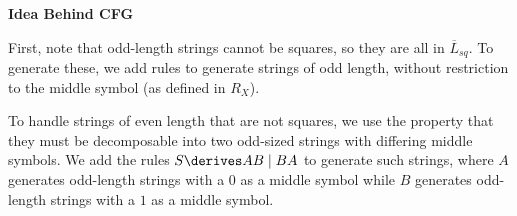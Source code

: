 \begin{problem}
\begin{enumalph}
\begin{Answer}
        \step
        \textbf{Idea Behind CFG}

        \step
        First, note that odd-length strings cannot be squares,
        so they are all in $\overline{L}_{sq}$.
        To generate these, we add rules to generate strings of odd length,
        without restriction to the middle symbol (as defined in $R_X$).

        \step
        To handle strings of even length that are not squares, we use the
        property that they must be decomposable into two odd-sized strings
        with differing middle symbols.
        We add the rules $S \derives AB \mid BA$ to generate such strings,
        where $A$ generates odd-length strings with a $0$ as a middle symbol
        while $B$ generates odd-length strings with a $1$ as a middle symbol.
      \end{Answer}
  \end{enumalph}
\end{problem}
